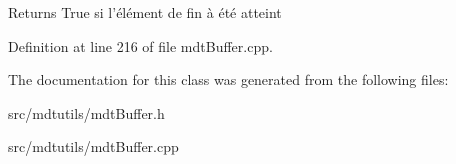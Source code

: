 \begin{DoxyReturn}{Returns}
True si l'élément de fin à été atteint 
\end{DoxyReturn}


Definition at line 216 of file mdtBuffer.cpp.



The documentation for this class was generated from the following files:\begin{DoxyCompactItemize}
\item 
src/mdtutils/mdtBuffer.h\item 
src/mdtutils/mdtBuffer.cpp\end{DoxyCompactItemize}
